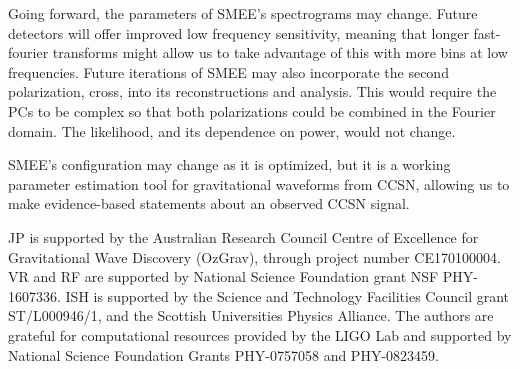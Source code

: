 \documentclass[letterpaper, aps, prd, twocolumn, superscriptaddress, showpacs, nofootinbib]{revtex4}
\begin{document}
Going forward, the parameters of SMEE's spectrograms may change. Future detectors will offer improved low frequency sensitivity, meaning that longer fast-fourier transforms might allow us to take advantage of this with more bins at low frequencies. Future iterations of SMEE may also incorporate the second polarization, cross, into its reconstructions and analysis. This would require the PCs to be complex so that both polarizations could be combined in the Fourier domain. The likelihood, and its dependence on power, would not change.

SMEE's configuration may change as it is optimized, but it is a working parameter estimation tool for gravitational waveforms from CCSN, allowing us to make evidence-based statements about an observed CCSN signal.

\begin{acknowledgments}
JP is supported by the Australian Research Council Centre of Excellence for Gravitational Wave Discovery (OzGrav), through project number CE170100004. VR and RF are supported by National Science Foundation grant NSF PHY-1607336. ISH is supported by the Science and Technology Facilities Council grant ST/L000946/1, and the Scottish Universities Physics Alliance. The authors are grateful for computational resources provided by the LIGO Lab and supported by National Science Foundation Grants PHY-0757058 and PHY-0823459. 
\end{acknowledgments}





\end{document}
